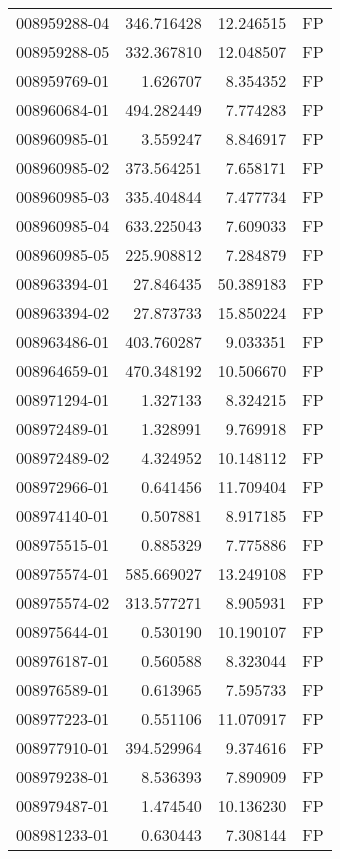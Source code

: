 \begin{tabular}{lrrl}
008959288-04 &  346.716428 &    12.246515 &   FP \\
008959288-05 &  332.367810 &    12.048507 &   FP \\
008959769-01 &    1.626707 &     8.354352 &   FP \\
008960684-01 &  494.282449 &     7.774283 &   FP \\
008960985-01 &    3.559247 &     8.846917 &   FP \\
008960985-02 &  373.564251 &     7.658171 &   FP \\
008960985-03 &  335.404844 &     7.477734 &   FP \\
008960985-04 &  633.225043 &     7.609033 &   FP \\
008960985-05 &  225.908812 &     7.284879 &   FP \\
008963394-01 &   27.846435 &    50.389183 &   FP \\
008963394-02 &   27.873733 &    15.850224 &   FP \\
008963486-01 &  403.760287 &     9.033351 &   FP \\
008964659-01 &  470.348192 &    10.506670 &   FP \\
008971294-01 &    1.327133 &     8.324215 &   FP \\
008972489-01 &    1.328991 &     9.769918 &   FP \\
008972489-02 &    4.324952 &    10.148112 &   FP \\
008972966-01 &    0.641456 &    11.709404 &   FP \\
008974140-01 &    0.507881 &     8.917185 &   FP \\
008975515-01 &    0.885329 &     7.775886 &   FP \\
008975574-01 &  585.669027 &    13.249108 &   FP \\
008975574-02 &  313.577271 &     8.905931 &   FP \\
008975644-01 &    0.530190 &    10.190107 &   FP \\
008976187-01 &    0.560588 &     8.323044 &   FP \\
008976589-01 &    0.613965 &     7.595733 &   FP \\
008977223-01 &    0.551106 &    11.070917 &   FP \\
008977910-01 &  394.529964 &     9.374616 &   FP \\
008979238-01 &    8.536393 &     7.890909 &   FP \\
008979487-01 &    1.474540 &    10.136230 &   FP \\
008981233-01 &    0.630443 &     7.308144 &   FP \\

\end{tabular}
